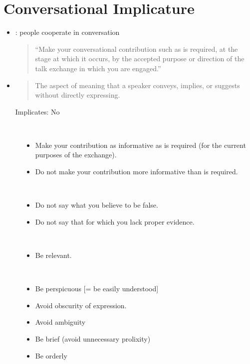 \documentclass[headrule,footrule]{foils}
\begin{document}
\section{Conversational Implicature}


\begin{itemize}
\item {}: people cooperate in conversation
  \begin{quote}
    ``Make your conversational contribution such as is required, at the stage at which it occurs, by the accepted purpose or direction of the talk exchange in which you are engaged.''
  \end{quote}
\item {}
  \begin{quote}
    The aspect of meaning that a speaker conveys, implies, or suggests
    without directly expressing.
  \end{quote}
  \begin{exe}
    \ex {}
    \ex {}
    \trans \textnormal{Implicates: No}
  \end{exe}

\end{itemize}

\begin{description}
\item [] ~
  \begin{itemize}
  \item Make your contribution as informative as is required (for the current purposes of the exchange).
  \item Do not make your contribution more informative than is required.
  \end{itemize}
\item [] ~
  \begin{itemize}
  \item Do not say what you believe to be false.
  \item Do not say that for which you lack proper evidence.
  \end{itemize}
\newpage
\item [] ~
  \begin{itemize}
  \item Be relevant.
  \end{itemize}
\item [] ~
  \begin{itemize}
  \item Be perspicuous [= be easily understood]
  \item Avoid obscurity of expression.
  \item Avoid ambiguity
  \item Be brief (avoid unnecessary prolixity)
  \item Be orderly
  \end{itemize}
\end{description}
\end{document}
